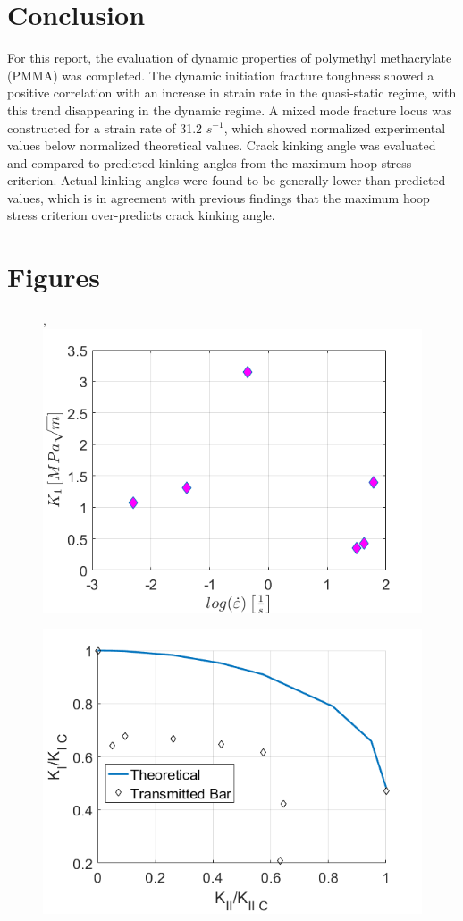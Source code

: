 \documentclass[12pt]{article}
\begin{document}
\section{Conclusion} %
For this report, the evaluation of dynamic properties of polymethyl methacrylate (PMMA) was completed. The dynamic initiation fracture toughness showed a positive correlation with an increase in strain rate in the quasi-static regime, with this trend disappearing in the dynamic regime. A mixed mode fracture locus was constructed for a strain rate of 31.2 $s^{-1}$, which showed normalized experimental values below normalized theoretical values. Crack kinking angle was evaluated and compared to predicted kinking angles from the maximum hoop stress criterion. Actual kinking angles were found to be generally lower than predicted values, which is in agreement with previous findings that the maximum hoop stress criterion over-predicts crack kinking angle.


\section{Figures} %

\begin{figure}[H], 
	\centering
	\includegraphics[width=.67\textwidth,scale=1]{Goal1_b.png}
	\caption{}
	\label{fig:Goal1}
\end{figure}

\begin{figure}[H]
	\centering
	\includegraphics[width=.67\textwidth,scale=1]{Goal2.png}
	\caption{}
	\label{fig:Goal2}
\end{figure}
\end{document}
